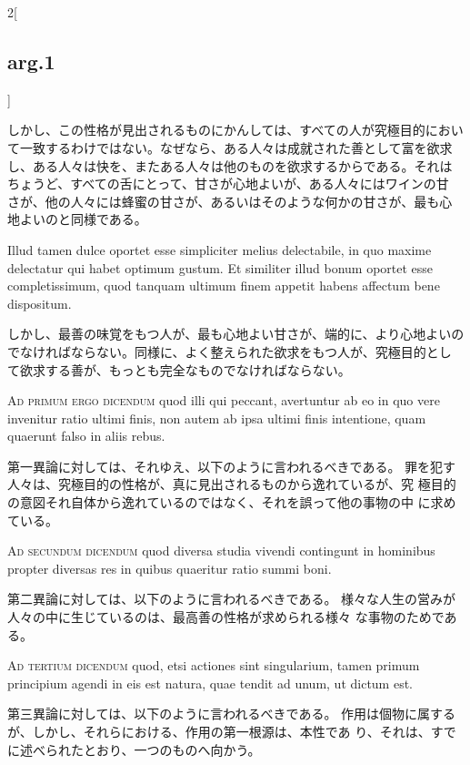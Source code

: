 \documentclass[paper=a4paper,fontsize=10pt,jafontsize=9pt,titlepage]{jlreq}
\begin{document}
\begin{paracol}{2}[\subsection{arg.1}]
\switchcolumn

しかし、この性格が見出されるものにかんしては、すべての人が究極目的におい
 て一致するわけではない。なぜなら、ある人々は成就された善として富を欲求
 し、ある人々は快を、またある人々は他のものを欲求するからである。それは
 ちょうど、すべての舌にとって、甘さが心地よいが、ある人々にはワインの甘
 さが、他の人々には蜂蜜の甘さが、あるいはそのような何かの甘さが、最も心
 地よいのと同様である。

\switchcolumn*

Illud tamen dulce oportet esse
simpliciter melius delectabile, in quo maxime delectatur qui habet
optimum gustum. Et similiter illud bonum oportet esse completissimum,
quod tanquam ultimum finem appetit habens affectum bene dispositum.

\switchcolumn

しかし、最善の味覚をもつ人が、最も心地よい甘さが、端的に、より心地よいの
 でなければならない。同様に、よく整えられた欲求をもつ人が、究極目的とし
 て欲求する善が、もっとも完全なものでなければならない。

\switchcolumn*[\subsection{ad.1}]

{\scshape Ad primum ergo dicendum} quod illi qui
peccant, avertuntur ab eo in quo vere invenitur ratio ultimi finis, non
autem ab ipsa ultimi finis intentione, quam quaerunt falso in aliis
rebus.

\switchcolumn

第一異論に対しては、それゆえ、以下のように言われるべきである。
罪を犯す人々は、究極目的の性格が、真に見出されるものから逸れているが、究
 極目的の意図それ自体から逸れているのではなく、それを誤って他の事物の中
 に求めている。

\switchcolumn*[\subsection{ad.2}]

{\scshape Ad secundum dicendum} quod diversa studia
vivendi contingunt in hominibus propter diversas res in quibus quaeritur
ratio summi boni.

\switchcolumn

第二異論に対しては、以下のように言われるべきである。
様々な人生の営みが人々の中に生じているのは、最高善の性格が求められる様々
 な事物のためである。

\switchcolumn*[\subsection{ad.3}]

{\scshape Ad tertium dicendum} quod, etsi actiones
sint singularium, tamen primum principium agendi in eis est natura, quae
tendit ad unum, ut dictum est.

\switchcolumn

第三異論に対しては、以下のように言われるべきである。
作用は個物に属するが、しかし、それらにおける、作用の第一根源は、本性であ
 り、それは、すでに述べられたとおり、一つのものへ向かう。

\end{paracol}
\end{document}
